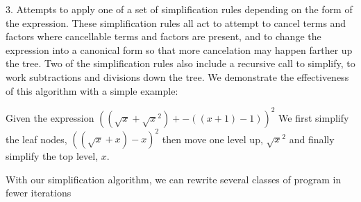 \documentclass{article}
\newcommand{\sqrsqrt}[1]{\sqrt{#1}^2}
\begin{document}
3. Attempts to apply one 
of a set of simplification rules 
depending on the form of the expression. 
These simplification rules 
all act to attempt to cancel terms and factors 
where cancellable terms and factors are present, 
and to change the expression into a canonical form 
so that more cancelation may happen 
farther up the tree. 
Two of the simplification rules 
also include a recursive call to simplify, 
to work subtractions and divisions down the tree.
We demonstrate the effectiveness of this algorithm 
with a simple example:

Given the expression
$((\sqrt{x} + \sqrsqrt{x}) + -((x + 1) - 1))^2$
We first simplify the leaf nodes,
$((\sqrt{x} + x) -x)^2$
then move one level up, 
$\sqrt{x}^2$
and finally simplify the top level,
$x$.

With our simplification algorithm, 
we can rewrite several classes of program
in fewer iterations
\end{document}
